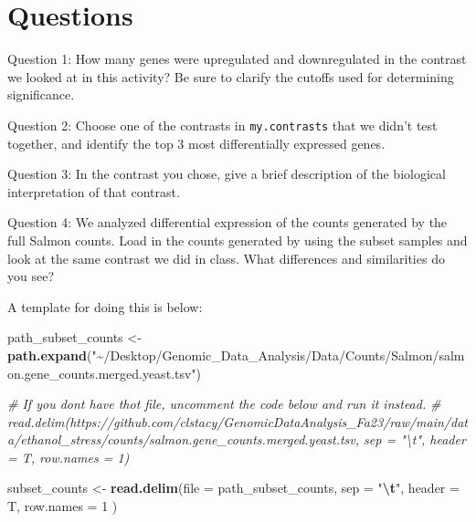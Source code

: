 \documentclass[
]{book}
\newenvironment{Shaded}{\begin{snugshade}}{\end{snugshade}}
\newcommand{\AttributeTok}[1]{\textcolor[rgb]{0.13,0.29,0.53}{#1}}
\newcommand{\CommentTok}[1]{\textcolor[rgb]{0.56,0.35,0.01}{\textit{#1}}}
\newcommand{\DecValTok}[1]{\textcolor[rgb]{0.00,0.00,0.81}{#1}}
\newcommand{\FunctionTok}[1]{\textcolor[rgb]{0.13,0.29,0.53}{\textbf{#1}}}
\newcommand{\NormalTok}[1]{#1}
\newcommand{\OtherTok}[1]{\textcolor[rgb]{0.56,0.35,0.01}{#1}}
\newcommand{\SpecialCharTok}[1]{\textcolor[rgb]{0.81,0.36,0.00}{\textbf{#1}}}
\newcommand{\StringTok}[1]{\textcolor[rgb]{0.31,0.60,0.02}{#1}}
\begin{document}
\hypertarget{questions-4}{%
\section{Questions}\label{questions-4}}

Question 1: How many genes were upregulated and downregulated in the contrast we looked at in this activity? Be sure to clarify the cutoffs used for determining significance.

Question 2: Choose one of the contrasts in \texttt{my.contrasts} that we didn't test together, and identify the top 3 most differentially expressed genes.

Question 3: In the contrast you chose, give a brief description of the biological interpretation of that contrast.

Question 4: We analyzed differential expression of the counts generated by the full Salmon counts. Load in the counts generated by using the subset samples and look at the same contrast we did in class. What differences and similarities do you see?

A template for doing this is below:

\begin{Shaded}
\begin{Highlighting}[]
\NormalTok{path\_subset\_counts }\OtherTok{\textless{}{-}} \FunctionTok{path.expand}\NormalTok{(}\StringTok{"\textasciitilde{}/Desktop/Genomic\_Data\_Analysis/Data/Counts/Salmon/salmon.gene\_counts.merged.yeast.tsv"}\NormalTok{)}

\CommentTok{\# If you don\textquotesingle{}t have thot file, uncomment the code below and run it instead.}
\CommentTok{\# read.delim(\textquotesingle{}https://github.com/clstacy/GenomicDataAnalysis\_Fa23/raw/main/data/ethanol\_stress/counts/salmon.gene\_counts.merged.yeast.tsv\textquotesingle{}, sep = "\textbackslash{}t", header = T, row.names = 1)}
  

\NormalTok{subset\_counts }\OtherTok{\textless{}{-}} \FunctionTok{read.delim}\NormalTok{(}\AttributeTok{file =}\NormalTok{ path\_subset\_counts,}
    \AttributeTok{sep =} \StringTok{"}\SpecialCharTok{\textbackslash{}t}\StringTok{"}\NormalTok{,}
    \AttributeTok{header =}\NormalTok{ T,}
    \AttributeTok{row.names =} \DecValTok{1}
\NormalTok{  )}
\end{Highlighting}
\end{Shaded}
\end{document}
